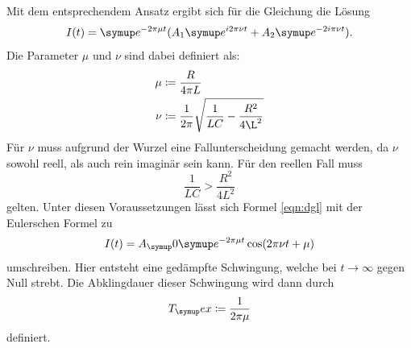 Mit dem entsprechendem Ansatz ergibt sich für die Gleichung die Lösung
\begin{equation}
  I(t)=\su{e}^{-2\pi\mu t}(A_1\su{e}^{i2\pi\nu t} + A_2\su{e}^{-2i\pi\nu t}).
  \label{eqn:dgl}
\end{equation}
Die Parameter $\mu$ und $\nu$ sind dabei definiert als:
\begin{align*}
  \mu &\coloneqq\frac{R}{4\pi L}\label{eqn:reff} \\
  \nu &\coloneqq\frac{1}{2\pi}\sqrt{\frac{1}{LC}-\frac{R^2}{4\L^2}}
\end{align*}
Für $\nu$ muss aufgrund der Wurzel eine Fallunterscheidung gemacht werden, da
$\nu$ sowohl reell, als auch rein imaginär sein kann.
Für den reellen Fall muss
\begin{equation*}
  \frac{1}{LC} > \frac{R^2}{4L^2}
\end{equation*}
gelten. Unter diesen Voraussetzungen lässt sich Formel \eqref{eqn:dgl} mit der
Eulerschen Formel zu
\begin{equation}
  I(t)=A_\su{0}\su{e}^{-2\pi\mu t}\cos(2\pi\nu t+\mu)
  \label{eqn:einh}
\end{equation}
umschreiben. Hier entsteht eine gedämpfte Schwingung, welche bei
$t\rightarrow\infty$
gegen Null strebt. Die Abklingdauer dieser Schwingung wird dann durch
\begin{equation}
  T_\su{ex}\coloneqq\frac{1}{2\pi\mu} \label{eqn:tex}
\end{equation}
definiert.

